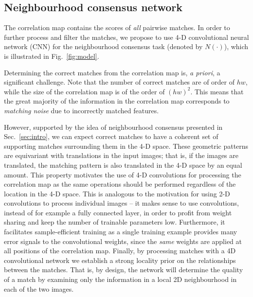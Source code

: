 \documentclass{article}
\begin{document}
\subsection{Neighbourhood consensus network}
The correlation map contains the scores of \emph{all} pairwise matches. In order to further process and filter the matches, we propose to use 4-D convolutional neural network (CNN) for the neighbourhood consensus task (denoted by $N(\cdot)$), which is  illustrated in Fig.~\ref{fig:model}.

Determining the correct matches from the correlation map is, \emph{a priori}, a significant challenge. Note that the number of correct matches are of order of $hw$, while the size of the correlation map is of the order of $(hw)^2$. This means that the great majority of the information in the correlation map corresponds to \emph{matching noise} due to incorrectly matched features.

However, supported by the idea of neighbourhood consensus presented in Sec.~\ref{sec:intro}, we can expect correct matches to have a coherent set of supporting matches surrounding them in the 4-D space. These geometric patterns are equivariant with translations in the input images; that is, if the images are translated, the matching pattern is also translated in the 4-D space by an equal amount. This property motivates the use of 4-D convolutions for processing the correlation map as the same operations should be performed regardless of the location in the 4-D space. This is analogous to the motivation for using 2-D convolutions to process individual images -- it makes sense to use convolutions, instead of for example a fully connected layer, in order to profit from weight sharing and keep the number of trainable parameters low. Furthermore, it facilitates sample-efficient training as a single training example provides many error signals to the convolutional weights, since the \emph{same} weights are applied at all positions of the correlation map. Finally, by processing matches with a 4D convolutional network we establish a strong locality prior on the relationships between the matches. That is, by design, the network will determine the quality of a match by examining only the information in a local 2D neighbourhood in each of the two images.
\end{document}
